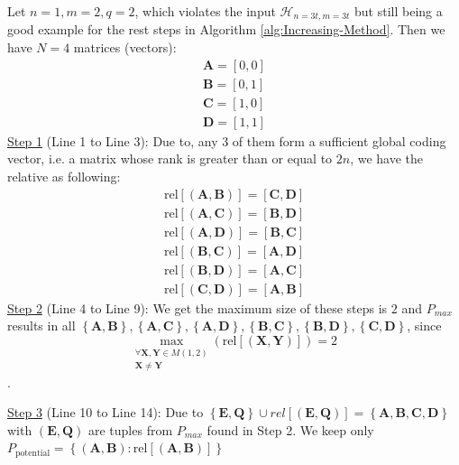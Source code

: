 \begin{example}
Let $n=1,m=2,q=2$, which violates the input $\mathcal{H}_{n=3t,m=3t}$
but still being a good example for the rest steps in Algorithm \ref{alg:Increasing-Method}.
Then we have $N=4$ matrices (vectors):
\[
\begin{array}{c}
\boldsymbol{A}=[0,0]\\
\boldsymbol{B}=[0,1]\\
\boldsymbol{C}=[1,0]\\
\boldsymbol{D}=[1,1]
\end{array}
\]
\uline{Step 1} (Line 1 to Line 3): Due to, any 3 of them form a
sufficient global coding vector, i.e. a matrix whose rank is greater
than or equal to $2n$, we have the relative as following:
\[
\begin{array}{c}
\mathrm{rel}\left[\left(\boldsymbol{A},\boldsymbol{B}\right)\right]=[\boldsymbol{C},\boldsymbol{D}]\\
\mathrm{rel}\left[\left(\boldsymbol{A},\boldsymbol{C}\right)\right]=[\boldsymbol{B},\boldsymbol{D}]\\
\mathrm{rel}\left[\left(\boldsymbol{A},\boldsymbol{D}\right)\right]=[\boldsymbol{B},\boldsymbol{C}]\\
\mathrm{rel}\left[\left(\boldsymbol{B},\boldsymbol{C}\right)\right]=[\boldsymbol{A},\boldsymbol{D}]\\
\mathrm{rel}\left[\left(\boldsymbol{B},\boldsymbol{D}\right)\right]=[\boldsymbol{A},\boldsymbol{C}]\\
\mathrm{rel}\left[\left(\boldsymbol{C},\boldsymbol{D}\right)\right]=[\boldsymbol{A},\boldsymbol{B}]
\end{array}
\]
\uline{Step 2} (Line 4 to Line 9): We get the maximum size of these
steps is $2$ and $P_{max}$ results in all $\left\{ \boldsymbol{A},\boldsymbol{B}\right\} ,\left\{ \boldsymbol{A},\boldsymbol{C}\right\} ,\left\{ \boldsymbol{A},\boldsymbol{D}\right\} ,\left\{ \boldsymbol{B},\boldsymbol{C}\right\} ,\left\{ \boldsymbol{B},\boldsymbol{D}\right\} ,\left\{ \boldsymbol{C},\boldsymbol{D}\right\} $,
since 
\[
\underset{\begin{array}{c}
\forall\boldsymbol{X},\boldsymbol{Y}\in M(1,2)\\
\boldsymbol{X}\neq\boldsymbol{Y}
\end{array}}{\mathrm{max}}\left(\mathrm{rel}\left[\left(\boldsymbol{X},\boldsymbol{Y}\right)\right]\right)=2
\]
.

\uline{Step 3} (Line 10 to Line 14): Due to $\left\{ \boldsymbol{E},\boldsymbol{Q}\right\} \cup rel\left[\left(\boldsymbol{E},\boldsymbol{Q}\right)\right]=\left\{ \boldsymbol{A},\boldsymbol{B},\boldsymbol{C},\boldsymbol{D}\right\} $
with $\left(\boldsymbol{E},\boldsymbol{Q}\right)$ are tuples from
$P_{max}$ found in Step 2. We keep only $P_{\mathrm{potential}}=\left\{ \left(\boldsymbol{A},\boldsymbol{B}\right):\mathrm{rel}\left[\left(\boldsymbol{A},\boldsymbol{B}\right)\right]\right\} $


\end{example}
